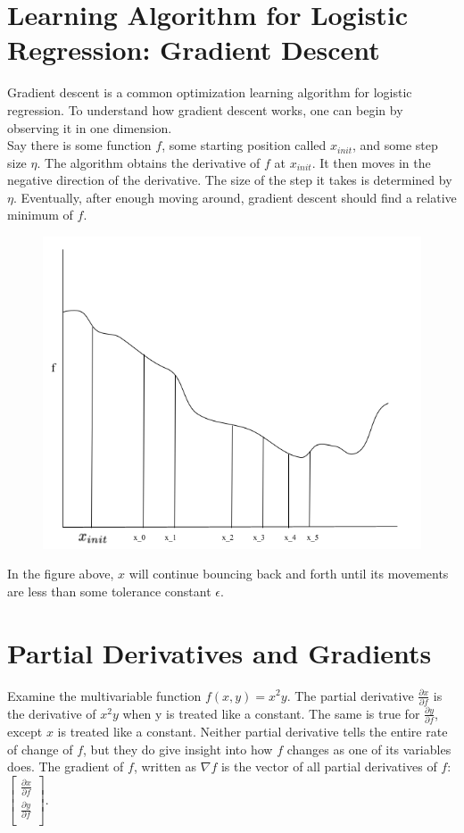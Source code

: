 \documentclass{article}
\begin{document}
    \section{Learning Algorithm for Logistic Regression: Gradient Descent}
    Gradient descent is a common optimization learning algorithm for logistic regression. To understand how gradient descent works, one can begin by observing it in one dimension. \\

    Say there is some function $f$, some starting position called $x_{init}$, and some step size $\eta$. The algorithm obtains the derivative of $f$ at $x_{init}$. It then moves in the negative direction of the derivative. The size of the step it takes is determined by $\eta$. Eventually, after enough moving around, gradient descent should find a relative minimum of $f$. \\

    \begin{figure}[H]
        \centering
        \includegraphics[width=0.5\linewidth]{Gradient Descent.png}
    \end{figure}

    In the figure above, $x$ will continue bouncing back and forth until its movements are less than some tolerance constant $\epsilon$.

    \section{Partial Derivatives and Gradients}
    Examine the multivariable function $f(x,y) = x^2y$. The partial derivative $\frac{\partial{x}}{\partial{f}}$ is the derivative of $x^2y$ when y is treated like a constant. The same is true for $\frac{\partial{y}}{\partial{f}}$, except $x$ is treated like a constant. Neither partial derivative tells the entire rate of change of $f$, but they do give insight into how $f$ changes as one of its variables does. The gradient of $f$, written as $\nabla{f}$ is the vector of all partial derivatives of $f$:
        $\begin{bmatrix}
               \frac{\partial{x}}{\partial{f}} \\
               \frac{\partial{y}}{\partial{f}} \\
        \end{bmatrix}$.
\end{document}
